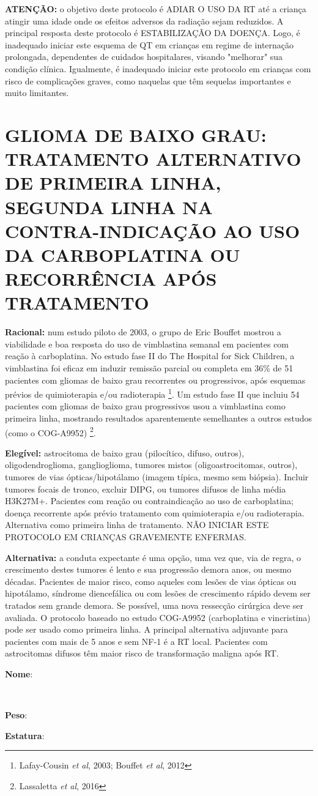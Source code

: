 \documentclass[11pt,a4paper,oldfontcommands]{memoir}
\def\entrywithlabel[#1]#2{\parbox{#1}{{\small #2:} \hrulefill}}
\begin{document}
\textbf{ATENÇÃO:} o objetivo deste protocolo é ADIAR O USO DA RT até a criança atingir uma idade onde os efeitos adversos da radiação sejam reduzidos. A principal resposta deste protocolo é ESTABILIZAÇÃO DA DOENÇA. Logo, é inadequado iniciar este esquema de QT em crianças em regime de internação prolongada, dependentes de cuidados hospitalares, visando "melhorar" sua condição clínica. Igualmente, é inadequado iniciar este protocolo em crianças com risco de complicações graves, como naquelas que têm sequelas importantes e muito limitantes.

\cleardoublepage

\section{GLIOMA DE BAIXO GRAU: TRATAMENTO ALTERNATIVO DE PRIMEIRA LINHA, SEGUNDA LINHA NA CONTRA-INDICAÇÃO AO USO DA CARBOPLATINA OU RECORRÊNCIA APÓS TRATAMENTO}
{\let\thefootnote\relax{}}
\textbf{Racional:} num estudo piloto de 2003, o grupo de Eric Bouffet mostrou a viabilidade e boa resposta do uso de vimblastina semanal em pacientes com reação à carboplatina. No estudo fase II do The Hospital for Sick Children, a vimblastina foi eficaz em induzir remissão parcial ou completa em 36\% de 51 pacientes com gliomas de baixo grau recorrentes ou progressivos, após esquemas prévios de quimioterapia e/ou radioterapia \footnote{Lafay-Cousin \textit{et al}, 2003; Bouffet \textit{et al}, 2012}. Um estudo fase II que incluiu 54 pacientes com gliomas de baixo grau progressivos usou a vimblastina como primeira linha, mostrando resultados aparentemente semelhantes a outros estudos (como o COG-A9952) \footnote{Lassaletta \textit{et al}, 2016}.

\textbf{Elegível:} astrocitoma de baixo grau (pilocítico, difuso, outros), oligodendroglioma, ganglioglioma, tumores mistos (oligoastrocitomas, outros), tumores de vias ópticas/hipotálamo (imagem típica, mesmo sem biópsia). Incluir tumores focais de tronco, excluir DIPG, ou tumores difusos de linha média H3K27M+. Pacientes com reação ou contraindicação ao uso de carboplatina; doença recorrente após prévio tratamento com quimioterapia e/ou radioterapia. Alternativa como primeira linha de tratamento. NÃO INICIAR ESTE PROTOCOLO EM CRIANÇAS GRAVEMENTE ENFERMAS.

\textbf{Alternativa:} a conduta expectante é uma opção, uma vez que, via de regra, o crescimento destes tumores é lento e sua progressão demora anos, ou mesmo décadas. Pacientes de maior risco, como aqueles com lesões de vias ópticas ou hipotálamo, síndrome diencefálica ou com lesões de crescimento rápido devem ser tratados sem grande demora. Se possível, uma nova ressecção cirúrgica deve ser avaliada. O protocolo baseado no estudo COG-A9952 (carboplatina e vincristina) pode ser usado como primeira linha. A principal alternativa adjuvante para pacientes com mais de 5 anos e sem NF-1 é a RT local. Pacientes com astrocitomas difusos têm maior risco de transformação maligna após RT.
\\[0.4cm]
\entrywithlabel[1\hsize]{\textbf{Nome}}\hfill
\\[0.3cm]
\entrywithlabel[.45\hsize]{\textbf{Peso}}\hfill  \entrywithlabel[.45\hsize]{\textbf{Estatura}}
\end{document}
